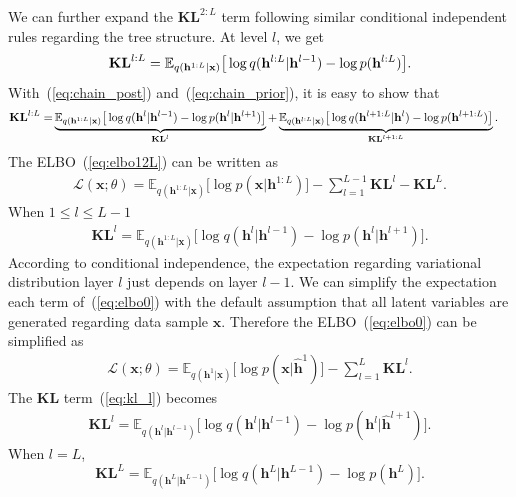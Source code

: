\documentclass[sigconf, anonymous, review]{acmart}
\theoremstyle{plain}
\theoremstyle{definition}
\theoremstyle{remark}
\begin{document}
We can further expand the $\mathbf{KL}^{2:L}$ term following similar conditional independent rules regarding the tree structure.
At level $l$, we get
$$\textbf{\text{KL}}^{l:L} 
= \mathbb{E}_{q(\mathbf{h}^{1:L}|\mathbf{x})}\big[  \log q(\mathbf{h}^{l:L}|\mathbf{h}^{l-1})- \log p(\mathbf{h}^{l:L})  \big].$$
With~(\ref{eq:chain_post}) and~(\ref{eq:chain_prior}), it is easy to show that
 \begin{align} \label{eq:kl_lL}
\textbf{\text{KL}}^{l:L} 
=&  \underbrace{\mathbb{E}_{q(\mathbf{h}^{1:L}|\mathbf{x})}\big[  \log q(\mathbf{h}^{l}|\mathbf{h}^{l-1})   - \log p(\mathbf{h}^{l}|\mathbf{h}^{l+1}) \big]}_{\mathbf{KL}^l}  + \underbrace{\mathbb{E}_{q(\mathbf{h}^{l:L}|\mathbf{x})}\big[  \log q(\mathbf{h}^{l+1:L}|\mathbf{h}^{l})- \log p(\mathbf{h}^{l+1:L})  \big]}_{\mathbf{KL}^{l+1:L}}.
\end{align}%
The ELBO~(\ref{eq:elbo12L}) can be written as 
 \begin{align} \label{eq:elbo0}
\mathcal{L}(\mathbf{x}; \theta) = \mathbb{E}_{q(\mathbf{h}^{1:L}|\mathbf{x})}\big[ \log p(\mathbf{x}|\mathbf{h}^{1:L})  \big] - \sum_{l=1}^{L-1} \mathbf{KL}^l -\mathbf{KL}^L.
\end{align}
When $1\leqslant l \leqslant L-1$
 \begin{align} \label{eq:kl_l}
 \mathbf{KL}^l=\mathbb{E}_{q(\mathbf{h}^{1:L}|\mathbf{x})}\big[  \log q(\mathbf{h}^{l}|\mathbf{h}^{l-1})   - \log p(\mathbf{h}^{l}|\mathbf{h}^{l+1}) \big].
 \end{align}%
According to conditional independence, the expectation regarding variational distribution layer $l$ just depends on layer $l-1$. We can simplify the expectation each term of~(\ref{eq:elbo0}) with the default assumption that all latent variables are generated regarding data sample $\mathbf{x}$.  Therefore the ELBO~(\ref{eq:elbo0}) can be simplified as 
 {\small
 \begin{align} \label{eq:elbo1}
\mathcal{L}(\mathbf{x}; \theta) = \mathbb{E}_{q(\mathbf{h}^{1}|\mathbf{x})}\big[ \log p(\mathbf{x}|\widehat{\mathbf{h}}^{1})  \big] - \sum_{l=1}^{L} \mathbf{KL}^l.
\end{align}}
The $\mathbf{KL}$
term~(\ref{eq:kl_l}) becomes
 {\small
\begin{align*}
 \mathbf{KL}^l=\mathbb{E}_{q(\mathbf{h}^{l}|\mathbf{h}^{l-1})}\big[  \log q(\mathbf{h}^{l}|\mathbf{h}^{l-1})   - \log p(\mathbf{h}^{l}|\widehat{\mathbf{h}}^{l+1}) \big].
 \end{align*}}
When $l=L$, 
 {\small$$\mathbf{KL}^L =  \mathbb{E}_{q(\mathbf{h}^{L}|\mathbf{h}^{L-1})}\big[  \log q(\mathbf{h}^{L}|\mathbf{h}^{L-1})- \log p(\mathbf{h}^{L})  \big].$$}
\end{document}
